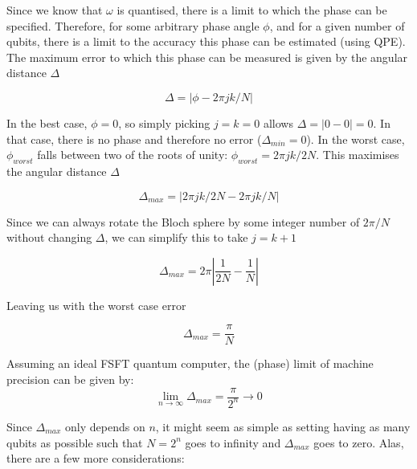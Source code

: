 \documentclass{book}
\begin{document}
Since we know that $\omega$ is quantised, there is a limit to which the phase can be specified. Therefore, for some arbitrary phase angle $\phi$, and for a given number of qubits, there is a limit to the accuracy this phase can be estimated (using QPE). The maximum error to which this phase can be measured is given by the angular distance $\Delta$

$$ \Delta = | \phi - 2\pi jk/N | $$

In the best case, $\phi = 0 $, so simply picking $ j = k = 0 $ allows $\Delta = | 0 - 0 | = 0 $. In that case, there is no phase and therefore no error ($\Delta_{min} = 0$). In the worst case, $\phi_{worst}$ falls between two of the roots of unity: $\phi_{worst} = 2\pi jk/2N$. This maximises the angular distance $\Delta$

$$ \Delta_{max} = | 2\pi jk/2N - 2\pi jk/N | $$

Since we can always rotate the Bloch sphere by some integer number of $ 2\pi/N $ without changing $ \Delta $, we can simplify this to take $j = k + 1$

$$ \Delta_{max} = 2\pi \left| \frac{1}{2N} - \frac{1}{N} \right| $$

Leaving us with the worst case error 

$$ \Delta_{max} = \frac{\pi}{N} $$

Assuming an ideal FSFT quantum computer, the (phase) limit of machine precision can be given by:
$$
\lim_{n \rightarrow \infty} \Delta_{max} = \frac{\pi}{2^n} \rightarrow 0
$$

Since $\Delta_{max}$ only depends on $n$, it might seem as simple as setting having as many qubits as possible such that $N = 2^n$ goes to infinity and $\Delta_{max}$ goes to zero. Alas, there are a few more considerations:
\end{document}
